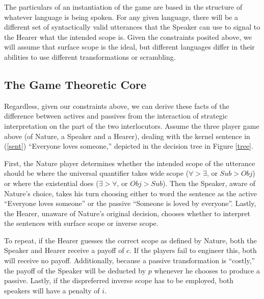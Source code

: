 \documentclass{article}
\begin{document}
The particulars of an instantiation of the game are based in the structure of whatever language is being spoken.
For any given language, there will be a different set of syntactically valid utterances that the Speaker can use to signal to the Hearer what the intended scope is.
Given the constraints posited above, we will assume that surface scope is the ideal, but different languages differ in their abilities to use different transformations or scrambling.


\subsection{The Game Theoretic Core}

Regardless, given our constraints above, we can derive these facts of the difference between actives and passives from the interaction of strategic interpretation on the part of the two interlocutors.
Assume the three player game above (of Nature, a Speaker and a Hearer), dealing with the kernel sentence in (\ref{sent}) ``Everyone loves someone,'' depicted in the decision tree in Figure \ref{tree}.

First, the Nature player determines whether the intended scope of the utterance should be where the universal quantifier takes wide scope ($\forall>\exists$, or $Sub > Obj$) or where the existential does ($\exists>\forall$, or $Obj > Sub$).
Then the Speaker, aware of Nature's choice, takes his turn choosing either to word the sentence as the active ``Everyone loves someone'' or the passive ``Someone is loved by everyone''.
Lastly, the Hearer, unaware of Nature's original decision, chooses whether to interpret the sentences with surface scope or inverse scope.

To repeat, if the Hearer guesses the correct scope as defined by Nature, both the Speaker and Hearer receive a payoff of $c$.
If the players fail to engineer this, both will receive no payoff.
Additionally, because a passive transformation is ``costly,'' the payoff of the Speaker will be deducted by $p$ whenever he chooses to produce a passive.
Lastly, if the dispreferred inverse scope has to be employed, both speakers will have a penalty of $i$.
\end{document}
